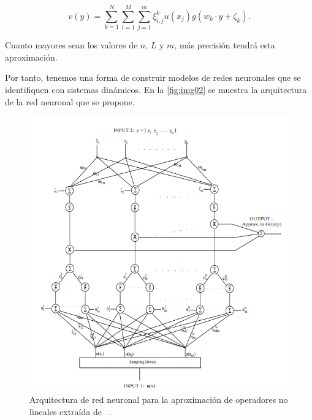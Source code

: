 \[v(y) = \sum_{k=1}^{N}\sum_{i=1}^{M}\sum_{j=1}^{m}\xi_{i,j}^{k}u(x_{j})g(w_{k}\cdot y+\zeta_{k}).\]

Cuanto mayores sean los valores de $n$, $L$ y $m$, más precisión tendrá esta aproximación. 

Por tanto, tenemos una forma de construir modelos de redes neuronales que se identifiquen con sistemas dinámicos. En la 
 \autoref{fig:img02} se muestra la arquitectura de la red neuronal que se propone. 

 \begin{figure}[ht]
    \centering
    \includegraphics[width=1\textwidth]{img/img02.png}
    \caption{Arquitectura de red neuronal para la aproximación de operadores no lineales extraída de ~\cite{chen1995universal}.}
    \label{fig:img02}
\end{figure}
\endinput

